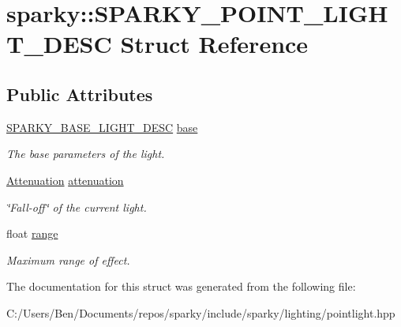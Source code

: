 \hypertarget{structsparky_1_1_s_p_a_r_k_y___p_o_i_n_t___l_i_g_h_t___d_e_s_c}{}\section{sparky\+:\+:S\+P\+A\+R\+K\+Y\+\_\+\+P\+O\+I\+N\+T\+\_\+\+L\+I\+G\+H\+T\+\_\+\+D\+E\+SC Struct Reference}
\label{structsparky_1_1_s_p_a_r_k_y___p_o_i_n_t___l_i_g_h_t___d_e_s_c}
\subsection*{Public Attributes}
\begin{DoxyCompactItemize}
\item 
\hyperlink{structsparky_1_1_s_p_a_r_k_y___b_a_s_e___l_i_g_h_t___d_e_s_c}{S\+P\+A\+R\+K\+Y\+\_\+\+B\+A\+S\+E\+\_\+\+L\+I\+G\+H\+T\+\_\+\+D\+E\+SC} \hyperlink{structsparky_1_1_s_p_a_r_k_y___p_o_i_n_t___l_i_g_h_t___d_e_s_c_ab07cf32717f09f5a977e5f760961fb4a}{base}\hypertarget{structsparky_1_1_s_p_a_r_k_y___p_o_i_n_t___l_i_g_h_t___d_e_s_c_ab07cf32717f09f5a977e5f760961fb4a}{}\label{structsparky_1_1_s_p_a_r_k_y___p_o_i_n_t___l_i_g_h_t___d_e_s_c_ab07cf32717f09f5a977e5f760961fb4a}

\begin{DoxyCompactList}\small\item\em The base parameters of the light. \end{DoxyCompactList}\item 
\hyperlink{structsparky_1_1_attenuation}{Attenuation} \hyperlink{structsparky_1_1_s_p_a_r_k_y___p_o_i_n_t___l_i_g_h_t___d_e_s_c_a61495a6dedb077e939aea5be9cd72619}{attenuation}\hypertarget{structsparky_1_1_s_p_a_r_k_y___p_o_i_n_t___l_i_g_h_t___d_e_s_c_a61495a6dedb077e939aea5be9cd72619}{}\label{structsparky_1_1_s_p_a_r_k_y___p_o_i_n_t___l_i_g_h_t___d_e_s_c_a61495a6dedb077e939aea5be9cd72619}

\begin{DoxyCompactList}\small\item\em \char`\"{}\+Fall-\/off\char`\"{} of the current light. \end{DoxyCompactList}\item 
float \hyperlink{structsparky_1_1_s_p_a_r_k_y___p_o_i_n_t___l_i_g_h_t___d_e_s_c_a1aa05df10bea864c48c19df36c877281}{range}\hypertarget{structsparky_1_1_s_p_a_r_k_y___p_o_i_n_t___l_i_g_h_t___d_e_s_c_a1aa05df10bea864c48c19df36c877281}{}\label{structsparky_1_1_s_p_a_r_k_y___p_o_i_n_t___l_i_g_h_t___d_e_s_c_a1aa05df10bea864c48c19df36c877281}

\begin{DoxyCompactList}\small\item\em Maximum range of effect. \end{DoxyCompactList}\end{DoxyCompactItemize}


The documentation for this struct was generated from the following file\+:\begin{DoxyCompactItemize}
\item 
C\+:/\+Users/\+Ben/\+Documents/repos/sparky/include/sparky/lighting/pointlight.\+hpp\end{DoxyCompactItemize}
